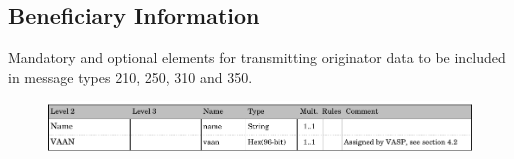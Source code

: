 \documentclass{article}
\begin{document}
\subsection{Beneficiary Information}
Mandatory and optional elements for transmitting originator data to be included in message types 210, 250, 310 and 350.
\begin{figure}[h]
    \centering
    \includegraphics[width=\textwidth]{g29.pdf}
\end{figure}
\end{document}
